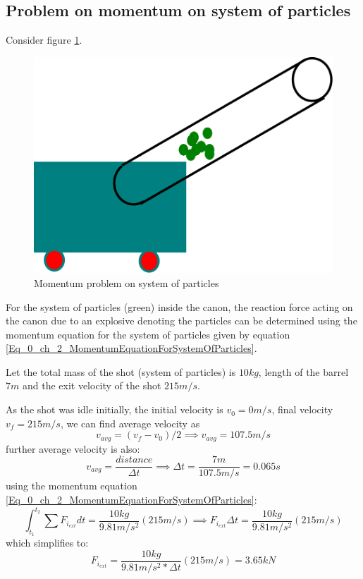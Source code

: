 \subsection{Problem on momentum on system of particles}

Consider figure \ref{fig_0_ch_2_MomentumProblemOnSystemOfParticles}.
\begin{figure}[h!]
	\centering
	\includegraphics[width=0.5\linewidth]{Bilder/10_MometumSystemOfParticles.pdf}
	\caption{Momentum problem on system of particles}
	\label{fig_0_ch_2_MomentumProblemOnSystemOfParticles}
\end{figure}

For the system of particles (green) inside the canon, the reaction force acting on the canon due to an explosive denoting the particles can be determined using the momentum equation for the system of particles given by equation \eqref{Eq_0_ch_2_MomentumEquationForSystemOfParticles}. 

Let the total mass of the shot (system of particles) is $10 kg$, length of the barrel $7 m$ and the exit velocity of the shot $215 m/s$.

As the shot was idle initially, the initial velocity is $v_{0} = 0 m/s$, final velocity $v_{f} = 215 m/s$, we can find average velocity as
\begin{equation}
	v_{avg} = (v_{f} - v_{0}) / 2 \implies v_{avg} = 107.5 m/s
\end{equation}
further average velocity is also:
\begin{equation}
	v_{avg} = \frac{distance}{\Delta t} \implies \Delta t = \frac{7 m}{107.5 m/s} = 0.065s
\end{equation}
using the momentum equation \eqref{Eq_0_ch_2_MomentumEquationForSystemOfParticles}:
\begin{equation}
	\int_{t_{1}}^{t_{2}} \sum F_{i_{ext}} dt = \frac{10 kg}{9.81 m/s^{2}} \left( 215 m/s \right) \implies F_{i_{ext}} \Delta t = \frac{10 kg}{9.81 m/s^{2}} \left( 215 m/s \right)
\end{equation}
which simplifies to:
\begin{equation}
	F_{i_{ext}} = \frac{10 kg}{9.81 m/s^{2} * \Delta t} \left( 215 m/s \right) = 3.65 kN
\end{equation}

